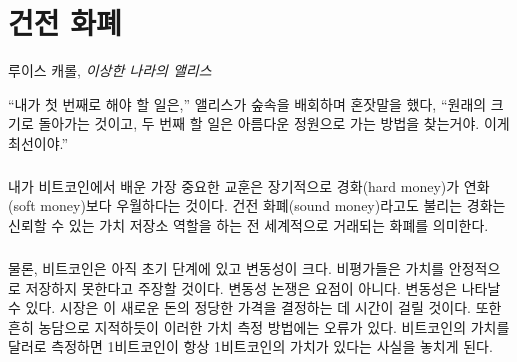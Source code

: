 \chapter{건전 화폐}
\label{les:14}

\begin{chapquote}{루이스 캐롤, \textit{이상한 나라의 앨리스}}
	\begin{comment}	
		\enquote{The first thing I've got to do,} said Alice to herself, as she wandered about
		in the wood, \enquote{is to grow to my right size, and the second thing is to find my
			way into that lovely garden. I think that will be the best plan.}
	\end{comment}
	\enquote{내가 첫 번째로 해야 할 일은,} 앨리스가 숲속을 배회하며 혼잣말을 했다, \enquote{원래의 크기로 돌아가는 것이고, 
		두 번째 할 일은 아름다운 정원으로 가는 방법을 찾는거야. 이게 최선이야.}
\end{chapquote}

\paragraph{}
\begin{comment}	
	The most important lesson I have learned from Bitcoin is that in the
	long run, hard money is superior to soft money. Hard money, also
	referred to as \textit{sound money}, is any globally traded currency that
	serves as a reliable store of value.
\end{comment}
내가 비트코인에서 배운 가장 중요한 교훈은 장기적으로 경화(hard money)가 연화(soft money)보다 우월하다는 것이다.
건전 화폐(sound money)라고도 불리는 경화는 신뢰할 수 있는 가치 저장소 역할을 하는 전 세계적으로 거래되는 화폐를 의미한다.

\paragraph{}
\begin{comment}	
	Granted, Bitcoin is still young and volatile. Critics will say that it
	does not store value reliably. The volatility argument is missing the
	point. Volatility is to be expected. The market will take a while to
	figure out the just price of this new money. Also, as is often jokingly
	pointed out, it is grounded in an error of measurement. If you think in
	dollars you will fail to see that one bitcoin will always be worth one
	bitcoin.
\end{comment}
물론, 비트코인은 아직 초기 단계에 있고 변동성이 크다. 
비평가들은 가치를 안정적으로 저장하지 못한다고 주장할 것이다.
변동성 논쟁은 요점이 아니다. 
변동성은 나타날 수 있다. 
시장은 이 새로운 돈의 정당한 가격을 결정하는 데 시간이 걸릴 것이다. 
또한 흔히 농담으로 지적하듯이 이러한 가치 측정 방법에는 오류가 있다. 
비트코인의 가치를 달러로 측정하면 1비트코인이 항상 1비트코인의 가치가 있다는 사실을 놓치게 된다.

